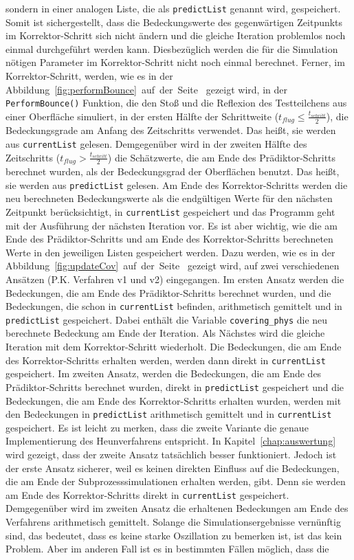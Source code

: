 \documentclass{listhesis}
\begin{document}
sondern in einer analogen Liste, die als \texttt{predictList} genannt wird, gespeichert. Somit ist sichergestellt, dass die Bedeckungswerte des gegenwärtigen Zeitpunkts im Korrektor-Schritt sich nicht ändern und die gleiche Iteration problemlos noch einmal durchgeführt werden kann. Diesbezüglich werden die für die Simulation nötigen Parameter im Korrektor-Schritt nicht noch einmal berechnet. Ferner, im Korrektor-Schritt, werden, wie es in der Abbildung~\ref{fig:performBounce}~auf~der~Seite~\pageref{fig:performBounce} gezeigt wird, in der \texttt{PerformBounce()} Funktion, die den Stoß und die Reflexion des Testteilchens aus einer Oberfläche simuliert, in der ersten Hälfte der Schrittweite ($t_{flug} \le \frac{t_{schritt}}{2}$), die Bedeckungsgrade am Anfang des Zeitschritts verwendet. Das heißt, sie werden aus \texttt{currentList} gelesen. Demgegenüber wird in der zweiten Hälfte des Zeitschritts ($t_{flug} > \frac{t_{schritt}}{2}$) die Schätzwerte, die am Ende des Prädiktor-Schritts berechnet wurden, als der Bedeckungsgrad der Oberflächen benutzt. Das heißt, sie werden aus \texttt{predictList} gelesen. Am Ende des Korrektor-Schritts werden die neu berechneten Bedeckungswerte als die endgültigen Werte für den nächsten Zeitpunkt berücksichtigt, in \texttt{currentList} gespeichert und das Programm geht mit der Ausführung der nächsten Iteration vor. Es ist aber wichtig, wie die am Ende des Prädiktor-Schritts und am Ende des Korrektor-Schritts berechneten Werte in den jeweiligen Listen gespeichert werden. Dazu werden, wie es in der Abbildung~\ref{fig:updateCov}~auf~der~Seite~\pageref{fig:updateCov} gezeigt wird, auf zwei verschiedenen Ansätzen (P.K. Verfahren v1 und v2) eingegangen. Im ersten Ansatz werden die Bedeckungen, die am Ende des Prädiktor-Schritts berechnet wurden, und die Bedeckungen, die schon in \texttt{currentList} befinden, arithmetisch gemittelt und in \texttt{predictList} gespeichert. Dabei enthält die Variable \texttt{covering\_phys} die neu berechnete Bedeckung am Ende der Iteration. Als Nächstes wird die gleiche Iteration mit dem Korrektor-Schritt wiederholt. Die Bedeckungen, die am Ende des Korrektor-Schritts erhalten werden, werden dann direkt in \texttt{currentList} gespeichert. Im zweiten Ansatz, werden die Bedeckungen, die am Ende des Prädiktor-Schritts berechnet wurden, direkt in \texttt{predictList} gespeichert und die Bedeckungen, die am Ende des Korrektor-Schritts erhalten wurden, werden mit den Bedeckungen in \texttt{predictList} arithmetisch gemittelt und in \texttt{currentList} gespeichert. Es ist leicht zu merken, dass die zweite Variante die genaue Implementierung des Heunverfahrens entspricht. In Kapitel~\ref{chap:auswertung} wird gezeigt, dass der zweite Ansatz tatsächlich besser funktioniert. Jedoch ist der erste Ansatz sicherer, weil es keinen direkten Einfluss auf die Bedeckungen, die am Ende der Subprozesssimulationen erhalten werden, gibt. Denn sie werden am Ende des Korrektor-Schritts direkt in \texttt{currentList} gespeichert. Demgegenüber wird im zweiten Ansatz die erhaltenen Bedeckungen am Ende des Verfahrens arithmetisch gemittelt. Solange die Simulationsergebnisse vernünftig sind, das bedeutet, dass es keine starke Oszillation zu bemerken ist, ist das kein Problem. Aber im anderen Fall ist es in bestimmten Fällen möglich, dass die 
\end{document}
